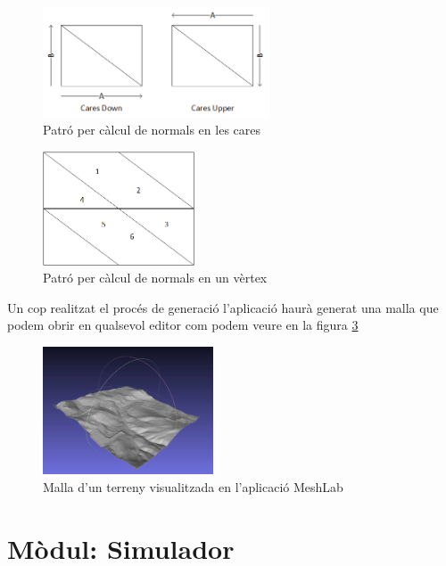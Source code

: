 \documentclass[10pt,a4paper]{article}
\begin{document}
\begin{figure}[!h]
\centering
  	\includegraphics[width=0.6\textwidth]{caranormal}
	\caption{Patró per càlcul de normals en les cares}
	\label{fig-normalcara}
\end{figure}

\begin{figure}[!h]
\centering
  	\includegraphics[width=0.4\textwidth]{vertexnormal}
	\caption{Patró per càlcul de normals en un vèrtex}
	\label{fig-normalvertex}
\end{figure}

\newpage
Un cop realitzat el procés de generació l'aplicació haurà generat una malla que podem obrir en qualsevol editor com podem veure en la figura \ref{fig-meshlab}

\begin{figure}[!h]
\centering
  	\includegraphics[width=0.45\textwidth]{mesh_example_meshlab}
	\caption{Malla d'un terreny visualitzada en l'aplicació MeshLab}
	\label{fig-meshlab}
\end{figure}

\section{Mòdul: Simulador}
\end{document}
